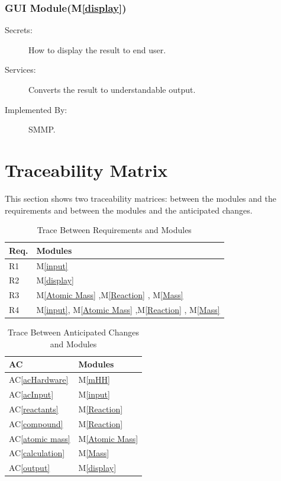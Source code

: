\documentclass[12pt, titlepage]{article}
\newcommand{\acref}[1]{AC\ref{#1}}
\newcommand{\mref}[1]{M\ref{#1}}
\begin{document}
\subsubsection{GUI Module(\mref{display})}

\begin{description}
\item[Secrets:] How to display the result to end user.
\item[Services:] Converts the result to understandable output. 
\item[Implemented By:] SMMP.
\end{description}


\section{Traceability Matrix} \label{SecTM}

This section shows two traceability matrices: between the modules and the
requirements and between the modules and the anticipated changes.

\begin{table}[H]
\centering
\begin{tabular}{p{} p{}}
\toprule
\textbf{Req.} & \textbf{Modules}\\
\midrule
R1 & \mref{input} \\
R2 & \mref{display}\\
R3 &    \mref{Atomic Mass} ,\mref{Reaction} ,  \mref{Mass}\\
R4 & \mref{input},  \mref{Atomic Mass} ,\mref{Reaction} , \mref{Mass}\\
\bottomrule
\end{tabular}
\caption{Trace Between Requirements and Modules}
\label{TblRT}
\end{table}


\begin{table}[H]
\centering
\begin{tabular}{p{} p{}}
\toprule
\textbf{AC} & \textbf{Modules}\\
\midrule
\acref{acHardware} & \mref{mHH}\\
\acref{acInput} &  \mref{input}\\
\acref{reactants} & \mref{Reaction}\\
\acref{compound} & \mref{Reaction}\\
\acref{atomic mass} & \mref{Atomic Mass}\\
\acref{calculation} & \mref{Mass}\\
\acref{output} & \mref{display}\\
\bottomrule
\end{tabular}
\caption{Trace Between Anticipated Changes and Modules}
\label{TblACT}
\end{table}
\end{document}
